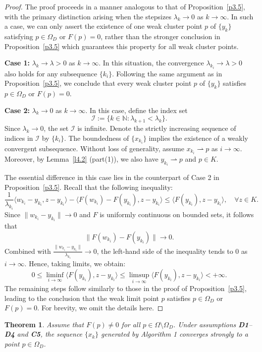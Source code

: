 \documentclass[hidelinks,11 pt]{article}
\numberwithin{equation}{section}
\newtheorem{theorem}{Theorem}[section]
\theoremstyle{definition}  %
\numberwithin{equation}{section}
\numberwithin{theorem}{section}
\begin{document}
\begin{proof}
    The proof proceeds in a manner analogous to that of Proposition~\ref{p3.5}, with the primary distinction arising when the stepsizes \( \lambda_k \to 0 \) as \( k \to \infty \). In such a case, we can only assert the existence of one weak cluster point \( p \) of \( \{y_k\} \) satisfying \( p \in \Omega_D \) or \( F(p) = 0 \), rather than the stronger conclusion in Proposition~\ref{p3.5} which guarantees this property for all weak cluster points.
    
    \vskip 2mm
    \noindent
    \textbf{Case 1:} \( \lambda_k \to \lambda > 0 \) as \( k \to \infty \). In this situation, the convergence \( \lambda_{k_i} \to \lambda > 0 \) also holds for any subsequence \( \{k_i\} \). Following the same argument as in Proposition~\ref{p3.5}, we conclude that every weak cluster point \( p \) of \( \{y_k\} \) satisfies \( p \in \Omega_D \) or \( F(p) = 0 \).

    \vskip 2mm
    \noindent
    \textbf{Case 2:} \( \lambda_k \to 0 \) as \( k \to \infty \). In this case, define the index set
    \[
        \mathcal{I} := \{k \in \mathbb{N} : \lambda_{k+1} < \lambda_k\}.
    \]
    Since \( \lambda_k \to 0 \), the set \( \mathcal{I} \) is infinite. Denote the strictly increasing sequence of indices in \( \mathcal{I} \) by \( \{k_i\} \). The boundedness of \( \{x_{k_i}\} \) implies the existence of a weakly convergent subsequence. Without loss of generality, assume \( x_{k_i} \rightharpoonup p \) as \( i \to \infty \). Moreover, by Lemma~\ref{l4.2} (part(1)), we also have \( y_{k_i} \rightharpoonup p \) and \( p \in K \).
    
    \vskip 1mm
    The essential difference in this case lies in the counterpart of Case 2 in Proposition~\ref{p3.5}. Recall that  the following inequality:
    \[
        \frac{1}{\lambda_{k_i}} \langle w_{k_i} - y_{k_i}, z - y_{k_i} \rangle - \langle F(w_{k_i}) - F(y_{k_i}), z - y_{k_i} \rangle \leq \langle F(y_{k_i}), z - y_{k_i} \rangle, \quad \forall z \in K.
    \]
    Since \( \|w_{k_i} - y_{k_i}\| \to 0 \) and \( F \) is uniformly continuous on bounded sets, it follows that
    \[
        \|F(w_{k_i}) - F(y_{k_i})\| \to 0.
    \]
    Combined with \( \frac{\|w_{k_i} - y_{k_i}\|}{\lambda_{k_i}} \to 0 \), the left-hand side of the inequality tends to 0 as \( i \to \infty \). Hence, taking limits, we obtain:
    \[
        0 \leq \liminf_{i \to \infty} \langle F(y_{k_i}), z - y_{k_i} \rangle \leq \limsup_{i \to \infty} \langle F(y_{k_i}), z - y_{k_i} \rangle < +\infty.
    \]
    The remaining steps follow similarly to those in the proof of Proposition~\ref{p3.5}, leading to the conclusion that the weak limit point \( p \) satisfies \( p \in \Omega_D \) or \( F(p) = 0 \). For brevity, we omit the details here.
\end{proof}
\begin{theorem}
Assume that \(F(p) \neq 0\) for all \(p \in \Omega \setminus \Omega_D\). Under assumptions \textbf{D1}–\textbf{D4} and \textbf{C5}, the sequence \(\{x_k\}\) generated by Algorithm 1 converges strongly to a point \(p \in \Omega_D\).
\end{theorem}
\end{document}
